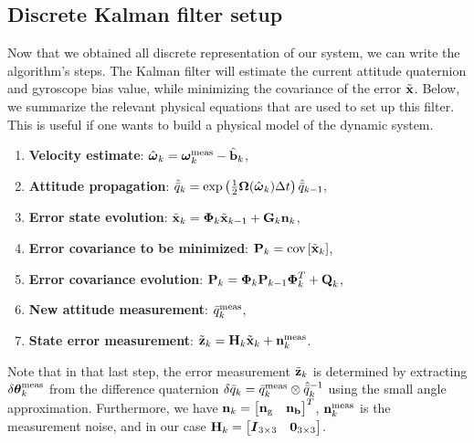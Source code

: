 \subsection{Discrete Kalman filter setup}
Now that we obtained all discrete representation of our system, we can write the algorithm's steps. The Kalman filter will estimate the current attitude quaternion and gyroscope bias value, while minimizing the covariance of the error $\tilde{\textrm{\textbf{x}}}$. Below, we summarize the relevant physical equations that are used to set up this filter. This is useful if one wants to build a physical model of the dynamic system.
\begin{enumerate}
\item \textbf{Velocity estimate}: $\hat{\boldsymbol\omega}_{k} = \boldsymbol\omega_k^{\textrm{meas}} - \hat{\textrm{\textbf{b}}}_{k}$,
\item \textbf{Attitude propagation}: $\hat{\bar{q}}_{k} = \exp\left(\frac{1}{2}\boldsymbol\Omega(\hat{\boldsymbol\omega}_{k})\Delta t\right)\hat{\bar{q}}_{k-1},$
\item \textbf{Error state evolution}: $\tilde{\textrm{\textbf{x}}}_{k}  = \boldsymbol{\Phi}_{k}\tilde{\textrm{\textbf{x}}}_{k-1} + \textrm{\textbf{G}}_{k}\textrm{\textbf{n}}_{k}$,
\item \textbf{Error covariance to be minimized}: $\textrm{\textbf{P}}_{k} = \textrm{cov}\left[ \tilde{\textrm{\textbf{x}}}_{k} \right]$,
\item \textbf{Error covariance evolution}: $\textrm{\textbf{P}}_{k}  =   \boldsymbol{\Phi}_k \textrm{\textbf{P}}_{k-1}\boldsymbol{\Phi}^T_k + \textrm{\textbf{Q}}_k$,
\item \textbf{New attitude measurement}: $\bar{q}^{\textrm{meas}}_k$, 
\item \textbf{State error measurement}: $\tilde{\textrm{\textbf{z}}}_k = \textrm{\textbf{H}}_k\tilde{\textrm{\textbf{x}}}_k + \textbf{n}^\textrm{meas}_k$. 
\end{enumerate}

Note that in that last step, the error measurement $\tilde{\textrm{\textbf{z}}}_k$ is determined by extracting $\delta\boldsymbol\theta_k^{\textrm{meas}}$ from the difference quaternion $\delta\bar{q}_k = \bar{q}^{\textrm{meas}}_k \otimes \hat{\bar{q}}^{-1}_{k}$ using the small angle approximation. Furthermore, we have $\textrm{\textbf{n}}_k = \begin{bmatrix} \textbf{n}_{\textrm{g}} & \textbf{n}_{\textrm{\textbf{b}}} \end{bmatrix}^T$, $\textbf{n}^\textrm{meas}_k$ is the measurement noise, and in our case $\textrm{\textbf{H}}_k = \begin{bmatrix} \boldsymbol{I}_{3\times 3} & \boldsymbol{0}_{3\times 3} \end{bmatrix}$.


